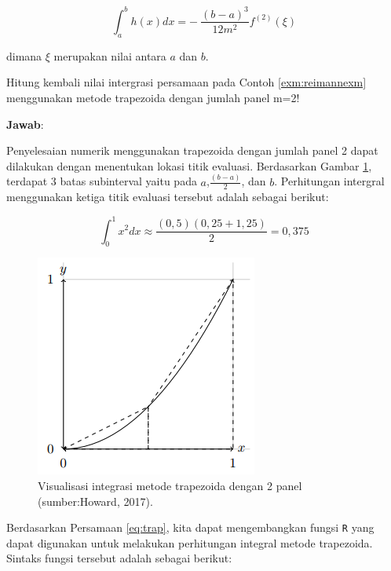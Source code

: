 \documentclass[]{book}
\theoremstyle{definition}
\theoremstyle{definition}
\theoremstyle{definition}
\theoremstyle{remark}
\let\BeginKnitrBlock\begin \let\EndKnitrBlock\end
\begin{document}
\begin{equation}
\int_a^bh\left(x\right)dx=-\ \frac{\left(b-a\right)^3}{12m^2}f^{\left(2\right)}\left(\xi\right)
  \label{eq:trap2}
\end{equation}

dimana \(\xi\) merupakan nilai antara \(a\) dan \(b\).

\BeginKnitrBlock{example}
\protect\hypertarget{exm:trapnexm}{}{\label{exm:trapnexm} }Hitung kembali nilai intergrasi persamaan pada Contoh \ref{exm:reimannexm} menggunakan metode trapezoida dengan jumlah panel m=2!
\EndKnitrBlock{example}

\textbf{Jawab}:

Penyelesaian numerik menggunakan trapezoida dengan jumlah panel 2 dapat dilakukan dengan menentukan lokasi titik evaluasi. Berdasarkan Gambar \ref{fig:trapviz2}, terdapat 3 batas subinterval yaitu pada \(a\),\(\frac{\left(b-a\right)}{2}\), dan \(b\). Perhitungan intergral menggunakan ketiga titik evaluasi tersebut adalah sebagai berikut:

\[
\int_0^1 x^2 dx \approx \frac{\left(0,5\right)\left(0,25+1,25\right)}{2}=0,375
\]

\begin{figure}

{\centering \includegraphics[width=0.7\linewidth]{./images/trapviz2} 

}

\caption{Visualisasi integrasi metode trapezoida dengan 2 panel (sumber:Howard, 2017).}\label{fig:trapviz2}
\end{figure}

Berdasarkan Persamaan \eqref{eq:trap}, kita dapat mengembangkan fungsi \texttt{R} yang dapat digunakan untuk melakukan perhitungan integral metode trapezoida. Sintaks fungsi tersebut adalah sebagai berikut:
\end{document}
